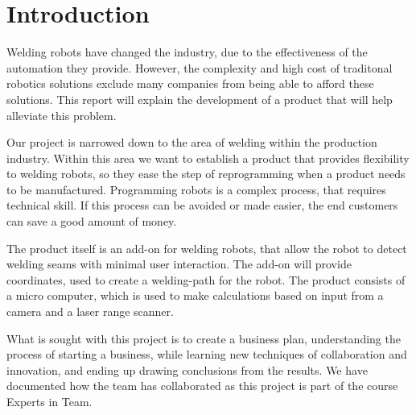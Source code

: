 \section{Introduction}


Welding robots have changed the industry, due to the effectiveness of the automation they provide. However, the complexity and high cost of traditonal robotics solutions exclude many companies from being able to afford these solutions. This report will explain the development of a product that will help alleviate this problem.

Our project is narrowed down to the area of welding within the production industry. Within this area we want to establish a product that provides flexibility to welding robots, so they ease the step of reprogramming when a product needs to be manufactured. Programming robots is a complex process, that requires technical skill. If this process can be avoided or made easier, the end customers can save a good amount of money. 

The product itself is an add-on for welding robots, that allow the robot to detect welding seams with minimal user interaction. The add-on will provide coordinates, used to create a welding-path for the robot. The product consists of a micro computer, which is used to make calculations based on input from a camera and a laser range scanner. 

What is sought with this project is to create a business plan, understanding the process of starting a business, while learning new techniques of collaboration and innovation, and ending up drawing conclusions from the results.
We have documented how the team has collaborated as this project is part of the course Experts in Team.